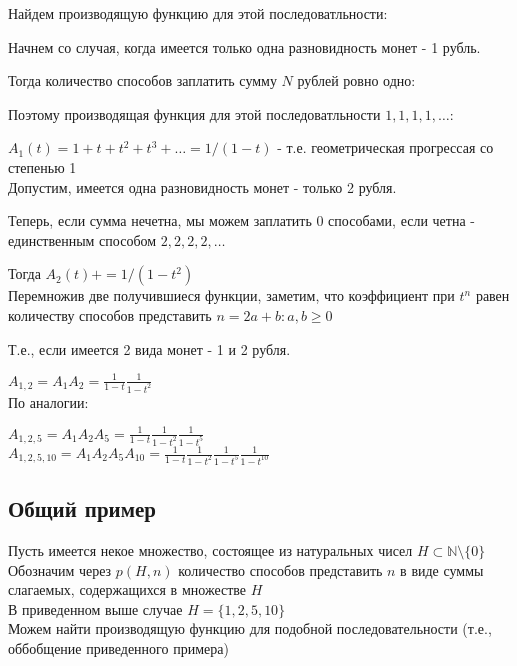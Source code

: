 Найдем производящую функцию для этой последоватльности:

Начнем со случая, когда имеется только одна разновидность монет - 1 рубль.

Тогда количество способов заплатить сумму $ N $ рублей ровно одно:

Поэтому производящая функция для этой последоватльности $1,1,1,1,\ldots$:

$A_1(t) = 1 + t + t^{2} + t^{3} + \ldots = 1/(1-t)$ 
- т.е. геометрическая прогрессая со степенью 1\\

Допустим, имеется одна разновидность монет - только 2 рубля.

Теперь, если сумма нечетна, мы можем заплатить 0 способами, 
если четна - единственным способом $2,2,2,2,\ldots$

Тогда
$A_2(t) + = 1/(1-t^2)$  \\

Перемножив две получившиеся функции, заметим, что коэффициент при $ t^{n} $ равен количеству способов представить $n = 2a + b: a,b \ge 0$

Т.е., если имеется 2 вида монет - 1 и 2 рубля.

$A_{1,2} = A_1 A_2 = \frac{1}{1 - t} \frac{1}{1 - t^{2} }$ \\

По аналогии:

$A_{1,2,5} = A_1 A_2 A_5 = \frac{1}{1 - t} \frac{1}{1 - t^{2}} \frac{1}{1 - t^{5}}$ \\

$A_{1,2,5,10} = A_1 A_2 A_5 A_{10} = \frac{1}{1 - t} \frac{1}{1 - t^{2}} \frac{1}{1 - t^{5}} \frac{1}{1 - t^{10}}$ \\

\subsection{Общий пример}

Пусть имеется некое множество, состоящее из натуральных чисел
$ H \subset \mathbb{N}\setminus\{0\} $ \\

Обозначим через 
$p(H,n)$ количество способов представить $ n $ в виде суммы слагаемых, содержащихся в множестве $ H $\\

В приведенном выше случае  $ H = \{1,2,5,10\}$ \\

Можем найти производящую функцию для подобной последовательности 
(т.е., оббобщение приведенного примера)

